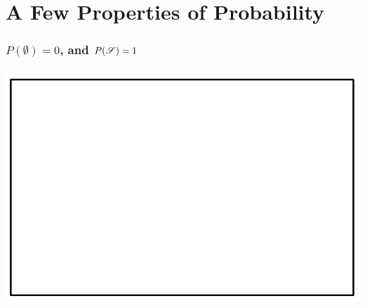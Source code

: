 \documentclass[compress]{beamer}
\begin{document}
\section{ A Few Properties of Probability}







%
%
%



\begin{frame}\frametitle{  $P(\emptyset)= 0$, and   $P(\mathscr{S})= 1$}
\begin{center}
\includegraphics[scale=.45]{figs/SampleSpace.png} 
\end{center}
\vspace{1in}
\end{frame}
\end{document}
